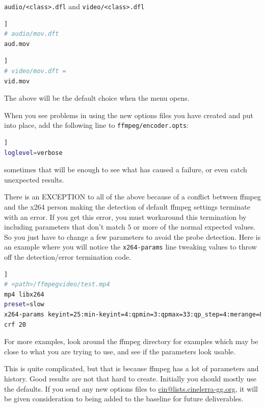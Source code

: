 \texttt{audio/<class>.dfl}  and  \texttt{video/<class>.dfl}

\begin{lstlisting}[language=bash,numbers=none]]
# audio/mov.dft
aud.mov
\end{lstlisting}

\begin{lstlisting}[language=bash,numbers=none]]
# video/mov.dft =
vid.mov
\end{lstlisting}

The above will be the default choice when the menu opens.  

When you see problems in using the new options files you have created and put into place, add the following line to \texttt{ffmpeg/encoder.opts}:

\begin{lstlisting}[language=bash,numbers=none]]
loglevel=verbose
\end{lstlisting}

sometimes that will be enough to see what has caused a failure, or even catch unexpected results.

There is an \textsc{EXCEPTION} to all of the above because of a conflict between ffmpeg and the x264 person making the detection of default ffmpeg settings terminate with an error.  If you get this error, you must workaround this termination by including parameters that don't match $5$ or more of the normal expected values.  So you just have to change a few parameters to avoid the probe detection.  Here is an example where you will notice the \texttt{x264-params} line tweaking values to throw off the detection/error termination code.

\begin{lstlisting}[language=bash,numbers=none]]
# <path>/ffmpegvideo/test.mp4
mp4 libx264
preset=slow
x264-params keyint=25:min-keyint=4:qpmin=3:qpmax=33:qp_step=4:merange=8
crf 20
\end{lstlisting}

For more examples, look around the ffmpeg directory for examples which may be close to what you are trying to use, and see if the parameters look usable. 

This is quite complicated, but that is because ffmpeg has a lot of parameters and history.  Good results are not that hard to create.  Initially you should mostly use the defaults.  
If you send any new options files to \href{mailto:cin@lists.cinelerra-gg.org}{cin@lists.cinelerra-gg.org}, it will be given consideration to being added to the baseline for future deliverables.

